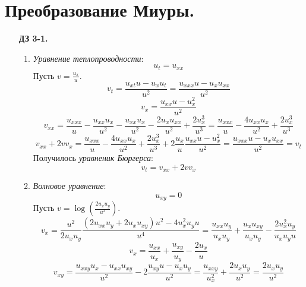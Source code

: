 \documentclass[12pt]{article}
\theoremstyle{definition}
\begin{document}
\section{Преобразование Миуры.}
\begin{itemize}
\item[\textbf{ДЗ 3-1.}]
\begin{enumerate}
    \item \textit{Уравнение теплопроводности}:
    \begin{equation}
        u_t=u_{xx}
    \end{equation}
    Пусть $v=\frac{u_x}{u}$.
    \begin{equation}
        v_t=\frac{u_{xt}u-u_xu_t}{u^2}=\frac{u_{xxx}u-u_xu_{xx}}{u^2}
    \end{equation}
    \begin{equation}
        v_x=\frac{u_{xx}u-u_x^2}{u^2}
    \end{equation}
    \begin{equation}
        v_{xx}=\frac{u_{xxx}}{u}-\frac{u_{xx}u_x}{u^2}-\frac{u_{xx}u_x}{u^2}-\frac{2u_xu_{xx}}{u^2}+\frac{2u_x^3}{u^3}=\frac{u_{xxx}}{u}-\frac{4u_{xx}u_x}{u^2}+\frac{2u_x^3}{u^3}
    \end{equation}
    \begin{equation}
        v_{xx}+2vv_x=\frac{u_{xxx}}{u}-\frac{4u_{xx}u_x}{u^2}+\frac{2u_x^3}{u^3}+2\frac{u_x}{u}\frac{u_{xx}u-u_x^2}{u^2}=\frac{u_{xxx}u-u_xu_{xx}}{u^2}=v_t
    \end{equation}
    Получилось \textit{уравненик Бюргерса}:
    \begin{equation}
        \boxed{v_t=v_{xx}+2vv_x}
    \end{equation}
    \item \textit{Волновое уравнение}:
    \begin{equation}
        u_{xy}=0
    \end{equation}
    Пусть $v=\log\left(\frac{2u_xu_y}{u^2}\right)$.
    \begin{equation}
        v_x=\frac{u^2}{2u_xu_y}\frac{(2u_{xx}u_y+2u_xu_{xy})u^2-4u_x^2u_yu}{u^4}=\frac{u_{xx}u_y}{u_xu_y}+\frac{u_xu_{xy}}{u_xu_y}-\frac{2u^2_xu_y}{u_xu_yu}
    \end{equation}
    \begin{equation}
        v_x=\frac{u_{xx}}{u_x}+\frac{u_{xy}}{u_y}-\frac{2u_x}{u}
    \end{equation}
    \begin{equation}
        v_{xy}=\frac{u_{xxy}u_x-u_{xx}u_{xy}}{u^2}-2\frac{u_{xy}u-u_xu_y}{u^2}=\frac{u_{xxy}}{u_x^2}+\frac{2u_xu_y}{u^2}=\frac{2u_xu_y}{u^2}

\end{equation}
\end{enumerate}
\end{itemize}
\end{document}
